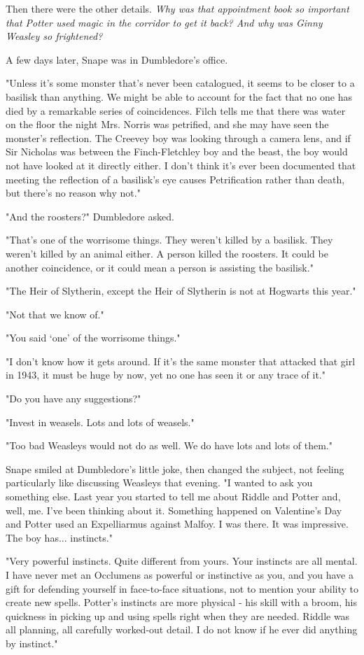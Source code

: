 \documentclass[a4paper,11pt]{article}
\begin{document}
Then there were the other details. \emph{Why was that appointment book so important that Potter used magic in the corridor to get it back? And why was Ginny Weasley so frightened?}

A few days later, Snape was in Dumbledore's office.

"Unless it's some monster that's never been catalogued, it seems to be closer to a basilisk than anything. We might be able to account for the fact that no one has died by a remarkable series of coincidences. Filch tells me that there was water on the floor the night Mrs. Norris was petrified, and she may have seen the monster's reflection. The Creevey boy was looking through a camera lens, and if Sir Nicholas was between the Finch-Fletchley boy and the beast, the boy would not have looked at it directly either. I don't think it's ever been documented that meeting the reflection of a basilisk's eye causes Petrification rather than death, but there's no reason why not."

"And the roosters?" Dumbledore asked.

"That's one of the worrisome things. They weren't killed by a basilisk. They weren't killed by an animal either. A person killed the roosters. It could be another coincidence, or it could mean a person is assisting the basilisk."

"The Heir of Slytherin, except the Heir of Slytherin is not at Hogwarts this year."

"Not that we know of."

"You said `one' of the worrisome things."

"I don't know how it gets around. If it's the same monster that attacked that girl in 1943, it must be huge by now, yet no one has seen it or any trace of it."

"Do you have any suggestions?"

"Invest in weasels. Lots and lots of weasels."

"Too bad Weasleys would not do as well. We do have lots and lots of them."

Snape smiled at Dumbledore's little joke, then changed the subject, not feeling particularly like discussing Weasleys that evening. "I wanted to ask you something else. Last year you started to tell me about Riddle and Potter and, well, me. I've been thinking about it. Something happened on Valentine's Day and Potter used an Expelliarmus against Malfoy. I was there. It was impressive. The boy has... instincts."

"Very powerful instincts. Quite different from yours. Your instincts are all mental. I have never met an Occlumens as powerful or instinctive as you, and you have a gift for defending yourself in face-to-face situations, not to mention your ability to create new spells. Potter's instincts are more physical - his skill with a broom, his quickness in picking up and using spells right when they are needed. Riddle was all planning, all carefully worked-out detail. I do not know if he ever did anything by instinct."
\end{document}
